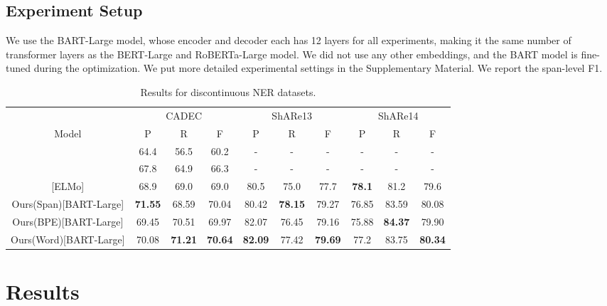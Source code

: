 \documentclass[11pt,a4paper]{article}
\begin{document}
\subsection{Experiment Setup}
We use the BART-Large model, whose encoder and decoder each has 12 layers for all experiments, making it the same number of transformer layers as the BERT-Large and RoBERTa-Large model. We did not use any other embeddings, and the BART model is fine-tuned during the optimization.  We put more detailed experimental settings in the Supplementary Material. We report the span-level F1.


\begin{table*}[!htb]
  \centering
  \setlength{\tabcolsep}{2pt}  \begin{tabular}{c|ccc|ccc|ccc}
\toprule
  & \multicolumn{3}{c|}{CADEC} & \multicolumn{3}{c|}{ShARe13} & \multicolumn{3}{c}{ShARe14} \\
  Model & P       & R      & F      & P        & R       & F       & P        & R       & F       \\
\midrule
  \citet{DBLP:conf/semweb/Metke-JimenezK16} & 64.4    & 56.5   & 60.2   & -        & -       & -       & -        & -       & -       \\
  \citet{DBLP:journals/wicomm/TangHWC18}    & 67.8    & 64.9   & 66.3   & -        & -       & -       & -        & -       & -       \\
  \citet{DBLP:conf/acl/DaiKHP20}[ELMo]     & 68.9    & 69.0   & 69.0   & 80.5     & 75.0    & 77.7    & \textbf{78.1}     & 81.2    & 79.6    \\
\midrule
  Ours(Span)[BART-Large]    & \textbf{71.55}  & 68.59 & 70.04  & 80.42    & \textbf{78.15}   & 79.27   & 76.85    & 83.59   & 80.08   \\
  Ours(BPE)[BART-Large]  & 69.45   & 70.51  & 69.97  & 82.07    & 76.45   & 79.16   & 75.88    & \textbf{84.37}   & 79.90   \\
  Ours(Word)[BART-Large] & 70.08   & \textbf{71.21}  & \textbf{70.64}  & \textbf{82.09}    & 77.42   & \textbf{79.69}   & 77.2     & 83.75   & \textbf{80.34}  \\
\bottomrule
  \end{tabular}
  \caption{Results for discontinuous NER datasets. }
  \label{tb:dis_ner}
\end{table*}

\section{Results}
\end{document}
